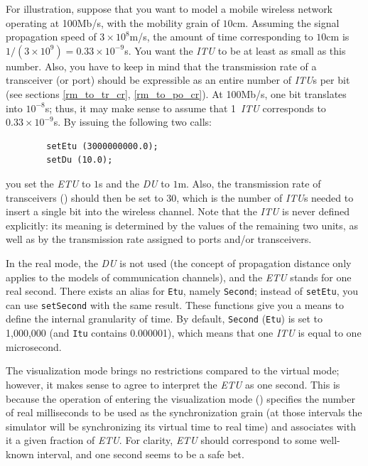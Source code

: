 For illustration,
suppose that you want to model a mobile wireless network operating
at 100Mb/s, with the mobility grain of $10$cm.
Assuming the signal propagation speed of $3 \times 10^8$m/s, the amount of
time corresponding to $10$cm is $1/(3 \times 10^9 ) = 0.33 \times 10^{-9}$s.
You want the {\em ITU\/} to be at least as small as this number.
Also, you have to keep in mind that the transmission rate of
a transceiver (or port) should be expressible as an entire number of
{\em ITU\/}s per
bit (see sections \ref{rm_to_tr_cr}, \ref{rm_to_po_cr}).
At 100Mb/s, one bit translates into $10^{-8}$s; thus, it may make sense to
assume that 1~{\em ITU\/} corresponds to $0.33 \times 10^{-9}$s.
By issuing the following two calls:
\begin{verbatim}
        setEtu (3000000000.0);
        setDu (10.0);
\end{verbatim}
you set the {\em ETU\/} to $1$s and the {\em DU\/} to $1$m.
Also, the transmission rate of transceivers ()
should then be set to $30$, which is the number of {\em ITU\/}s needed to insert
a single bit into the wireless channel.
Note that the {\em ITU\/} is never defined explicitly: its meaning is
determined by the values of the remaining two units, as well as by the
transmission rate assigned to ports and/or transceivers.

In the real mode, the {\em DU\/} is not used
(the concept of propagation distance only applies
to the models of communication channels), and
the {\em ETU\/} stands for one real second.
There exists an alias for {\tt Etu}, namely {\tt Second};
instead of {\tt setEtu}, you can use {\tt setSecond} with the same
result.
These functions give you a means to define the internal granularity of time.
By default, {\tt Second} ({\tt Etu}) is set to 1,000,000 (and {\tt Itu}
contains 0.000001), which means that one {\em ITU\/} is equal to one
microsecond.

The visualization mode brings no restrictions compared to the
virtual mode; however, it makes sense to agree to interpret the
{\em ETU\/} as one second.
This is because the operation of entering the visualization mode
() specifies the number of real 
milliseconds to be used as the synchronization grain (at those intervals
the simulator will be synchronizing its virtual time to real time)
and associates with it a given fraction of {\em ETU}.
For clarity, {\em ETU\/} should correspond to some well-known interval, and
one second seems to be a safe bet.

